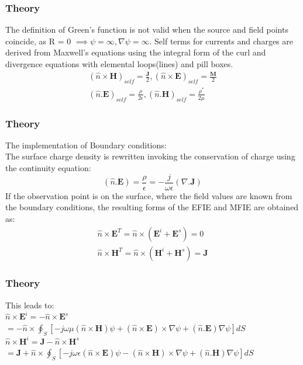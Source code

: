 \documentclass{beamer}
\begin{document}
\begin{frame}
\frametitle{Theory}
The definition of Green's function is not valid when the source and field points coincide, as R = 0 $\implies \psi =\infty, \nabla\psi=\infty$. Self terms for currents and charges are derived from Maxwell's equations using the integral form of the curl and divergence equations with elemental loops(lines) and pill boxes.
\begin{eqnarray}
(\hat{n}\times\textbf{H})_{self} = \frac{\textbf{J}}{2},(\hat{n}\times\textbf{E})_{self} = \frac{\textbf{M}}{2} \\
(\hat{n}.\textbf{E})_{self} = \frac{\rho}{2\epsilon},(\hat{n}.\textbf{H})_{self} = \frac{\rho^*}{2\mu}
\end{eqnarray}
\end{frame}
\begin{frame}
\frametitle{Theory}
The implementation of Boundary conditions: \\
The surface charge density is rewritten invoking the conservation of charge using the continuity equation:
\begin{equation}
(\hat{n}.\textbf{E}) = \frac{\rho}{\epsilon} = -\frac{j}{\omega\epsilon}(\nabla.\textbf{J})
\end{equation}
If the observation point is on the surface, where the field values are known from the boundary conditions, the resulting forms of the EFIE and MFIE are obtained as:
\begin{eqnarray}
\hat{n}\times\textbf{E}^T = \hat{n}\times(\textbf{E}^i + \textbf{E}^s) = 0 \\
\hat{n}\times\textbf{H}^T = \hat{n}\times(\textbf{H}^i + \textbf{H}^s) = \textbf{J}
\end{eqnarray}
\end{frame}
\begin{frame}
\frametitle{Theory}
This leads to: \\
$\hat{n}\times\textbf{E}^i=-\hat{n}\times\textbf{E}^s $\\
$=-\hat{n}\times\oint_S[-j\omega\mu(\hat{n}\times\textbf{H})\psi + (\hat{n}\times\textbf{E})\times\nabla\psi + (\hat{n}.\textbf{E})\nabla\psi]dS$\\
$\hat{n}\times\textbf{H}^i = \textbf{J} -\hat{n}\times\textbf{H}^s$\\
$ =\textbf{J} + \hat{n}\times\oint_S[-j\omega\epsilon(\hat{n}\times\textbf{E})\psi - (\hat{n}\times\textbf{H})\times\nabla\psi + (\hat{n}.\textbf{H})\nabla\psi]dS$
\end{frame}
\end{document}

